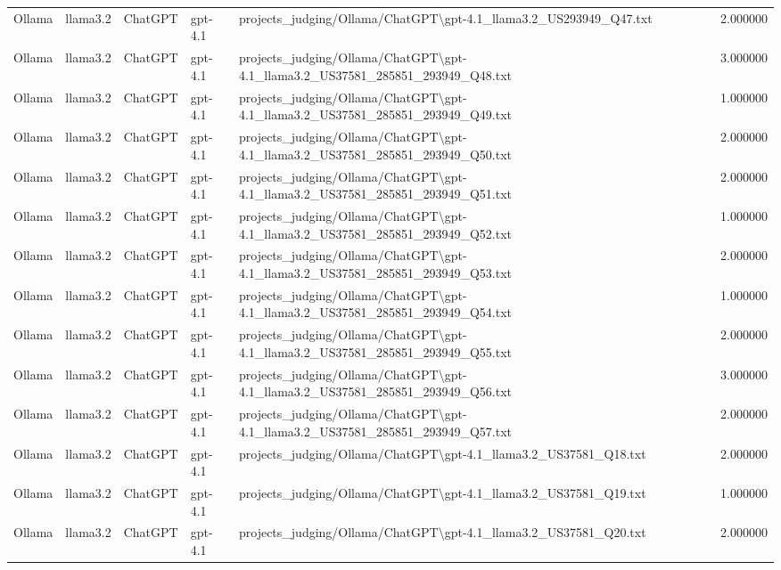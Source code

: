 \begin{table}[H]
\begin{tabular}{lllllr}
Ollama & llama3.2 & ChatGPT & gpt-4.1 & projects\_judging/Ollama/ChatGPT\textbackslash gpt-4.1\_llama3.2\_US293949\_Q47.txt & 2.000000 \\
Ollama & llama3.2 & ChatGPT & gpt-4.1 & projects\_judging/Ollama/ChatGPT\textbackslash gpt-4.1\_llama3.2\_US37581\_285851\_293949\_Q48.txt & 3.000000 \\
Ollama & llama3.2 & ChatGPT & gpt-4.1 & projects\_judging/Ollama/ChatGPT\textbackslash gpt-4.1\_llama3.2\_US37581\_285851\_293949\_Q49.txt & 1.000000 \\
Ollama & llama3.2 & ChatGPT & gpt-4.1 & projects\_judging/Ollama/ChatGPT\textbackslash gpt-4.1\_llama3.2\_US37581\_285851\_293949\_Q50.txt & 2.000000 \\
Ollama & llama3.2 & ChatGPT & gpt-4.1 & projects\_judging/Ollama/ChatGPT\textbackslash gpt-4.1\_llama3.2\_US37581\_285851\_293949\_Q51.txt & 2.000000 \\
Ollama & llama3.2 & ChatGPT & gpt-4.1 & projects\_judging/Ollama/ChatGPT\textbackslash gpt-4.1\_llama3.2\_US37581\_285851\_293949\_Q52.txt & 1.000000 \\
Ollama & llama3.2 & ChatGPT & gpt-4.1 & projects\_judging/Ollama/ChatGPT\textbackslash gpt-4.1\_llama3.2\_US37581\_285851\_293949\_Q53.txt & 2.000000 \\
Ollama & llama3.2 & ChatGPT & gpt-4.1 & projects\_judging/Ollama/ChatGPT\textbackslash gpt-4.1\_llama3.2\_US37581\_285851\_293949\_Q54.txt & 1.000000 \\
Ollama & llama3.2 & ChatGPT & gpt-4.1 & projects\_judging/Ollama/ChatGPT\textbackslash gpt-4.1\_llama3.2\_US37581\_285851\_293949\_Q55.txt & 2.000000 \\
Ollama & llama3.2 & ChatGPT & gpt-4.1 & projects\_judging/Ollama/ChatGPT\textbackslash gpt-4.1\_llama3.2\_US37581\_285851\_293949\_Q56.txt & 3.000000 \\
Ollama & llama3.2 & ChatGPT & gpt-4.1 & projects\_judging/Ollama/ChatGPT\textbackslash gpt-4.1\_llama3.2\_US37581\_285851\_293949\_Q57.txt & 2.000000 \\
Ollama & llama3.2 & ChatGPT & gpt-4.1 & projects\_judging/Ollama/ChatGPT\textbackslash gpt-4.1\_llama3.2\_US37581\_Q18.txt & 2.000000 \\
Ollama & llama3.2 & ChatGPT & gpt-4.1 & projects\_judging/Ollama/ChatGPT\textbackslash gpt-4.1\_llama3.2\_US37581\_Q19.txt & 1.000000 \\
Ollama & llama3.2 & ChatGPT & gpt-4.1 & projects\_judging/Ollama/ChatGPT\textbackslash gpt-4.1\_llama3.2\_US37581\_Q20.txt & 2.000000 \\

\end{tabular}
\end{table}
